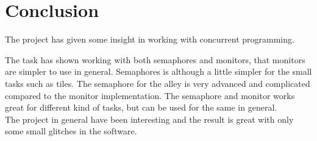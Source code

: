 \section{Conclusion}
The project has given some insight in working with concurrent programming. 

The task has shown working with both semaphores and monitors, that monitors are simpler to use in general. Semaphores is although a little simpler for the small tasks such as tiles. The semaphore for the alley is very advanced and complicated compared to the monitor implementation. The semaphore and monitor works great for different kind of tasks, but can be used for the same in general.
\\

The project in general have been interesting and the result is great with only some small glitches in the software.